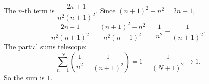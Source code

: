 The $n$-th term is $\dfrac{2n+1}{n^2(n+1)^2}$. Since $(n+1)^2-n^2=2n+1$,
\[
\dfrac{2n+1}{n^2(n+1)^2}=\dfrac{(n+1)^2-n^2}{n^2(n+1)^2}=\dfrac{1}{n^2}-\dfrac{1}{(n+1)^2}.
\]
The partial sums telescope:
\[
\sum_{n=1}^{N}\left(\dfrac{1}{n^2}-\dfrac{1}{(n+1)^2}\right)=1-\dfrac{1}{(N+1)^2}\longrightarrow1 .
\]
So the sum is $\boxed{1}$.
